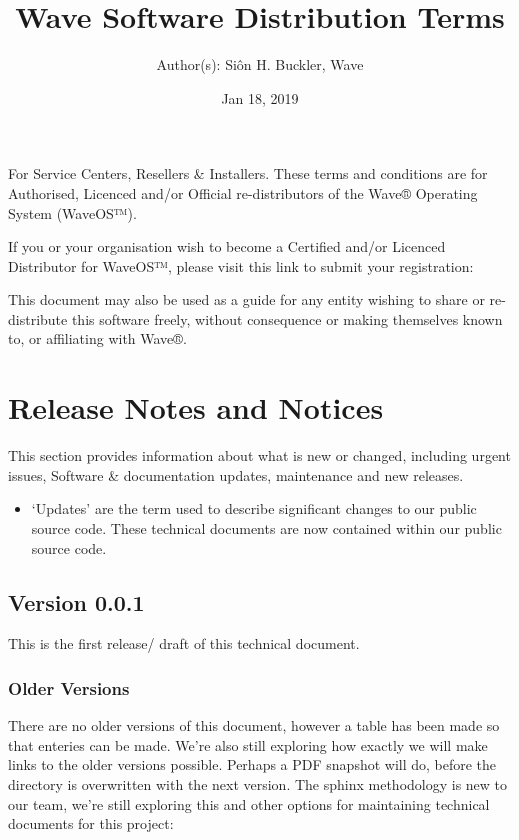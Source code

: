 \documentclass[letterpaper,10pt,english]{sphinxmanual}
\title{Wave Software Distribution Terms}
\date{Jan 18, 2019}
\author{Author(s): Siôn H. Buckler, Wave}
\begin{document}
\maketitle
\sphinxtableofcontents
{}\label{\detokenize{index::doc}}


For Service Centers, Resellers \& Installers. These terms and conditions are for Authorised, Licenced and/or Official re-distributors of the Wave® Operating System (WaveOS™).

If you or your organisation wish to become a Certified and/or Licenced Distributor for WaveOS™, please visit this link to submit your registration:  

This document may also be used as a guide for any entity wishing to share or re-distribute this software freely, without consequence or making themselves known to, or affiliating with Wave®.


\chapter{Release Notes and Notices}
\label{\detokenize{releasenotes:release-notes-and-notices}}\label{\detokenize{releasenotes::doc}}
This section provides information about what is new or changed, including urgent issues, Software \& documentation updates, maintenance and new releases.
\begin{itemize}
\item {} 
‘Updates’ are the term used to describe significant changes to our public source code. These technical documents are now contained within our public source code.

\end{itemize}


\section{Version 0.0.1}
\label{\detokenize{releasenotes:version-0-0-1}}
This is the first release/ draft of this technical document.


\subsection{Older Versions}
\label{\detokenize{releasenotes:older-versions}}
There are no older versions of this document, however a table has been made so that enteries can be made. We’re also still exploring how exactly we will make links to the older versions possible. Perhaps a PDF snapshot will do, before the directory is overwritten with the next version. The sphinx methodology is new to our team, we’re still exploring this and other options for maintaining technical documents for this project:
\end{document}
